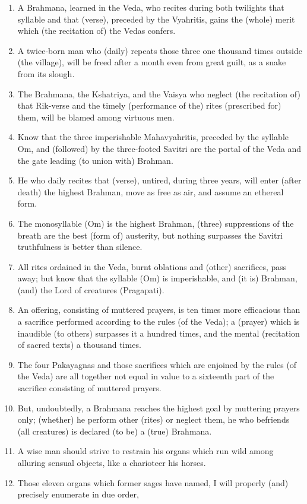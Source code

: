 \begin{enumerate}
\item A Brahmana, learned in the Veda, who recites during both twilights that syllable and that (verse), preceded by the Vyahritis, gains the (whole) merit which (the recitation of) the Vedas confers.
\item A twice-born man who (daily) repeats those three one thousand times outside (the village), will be freed after a month even from great guilt, as a snake from its slough.
\item The Brahmana, the Kshatriya, and the Vaisya who neglect (the recitation of) that Rik-verse and the timely (performance of the) rites (prescribed for) them, will be blamed among virtuous men.
\item Know that the three imperishable Mahavyahritis, preceded by the syllable Om, and (followed) by the three-footed Savitri are the portal of the Veda and the gate leading (to union with) Brahman.
\item He who daily recites that (verse), untired, during three years, will enter (after death) the highest Brahman, move as free as air, and assume an ethereal form.
\item The monosyllable (Om) is the highest Brahman, (three) suppressions of the breath are the best (form of) austerity, but nothing surpasses the Savitri truthfulness is better than silence.
\item All rites ordained in the Veda, burnt oblations and (other) sacrifices, pass away; but know that the syllable (Om) is imperishable, and (it is) Brahman, (and) the Lord of creatures (Pragapati).
\item An offering, consisting of muttered prayers, is ten times more efficacious than a sacrifice performed according to the rules (of the Veda); a (prayer) which is inaudible (to others) surpasses it a hundred times, and the mental (recitation of sacred texts) a thousand times.
\item The four Pakayagnas and those sacrifices which are enjoined by the rules (of the Veda) are all together not equal in value to a sixteenth part of the sacrifice consisting of muttered prayers.
\item But, undoubtedly, a Brahmana reaches the highest goal by muttering prayers only; (whether) he perform other (rites) or neglect them, he who befriends (all creatures) is declared (to be) a (true) Brahmana.
\item A wise man should strive to restrain his organs which run wild among alluring sensual objects, like a charioteer his horses.
\item Those eleven organs which former sages have named, I will properly (and) precisely enumerate in due order,

\end{enumerate}
